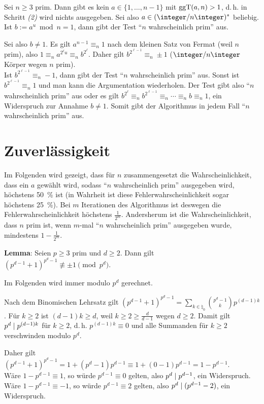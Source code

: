 \begin{Beweis}
    Sei $n \ge 3$ prim.
    Dann gibt es kein $a \in \{1, \dotsc, n - 1\}$ mit $\operatorname{ggT}(a, n) > 1$, d.\,h.
    in Schritt \emph{(2)} wird nichts ausgegeben.
    Sei also $a \in (\ZnZ)^\ast$ beliebig.
    Ist $b := a^u \bmod n = 1$, dann gibt der Test "`$n$ wahrscheinlich prim"' aus.

    Sei also $b \not= 1$.
    Es gilt $a^{n-1} \equiv_n 1$ nach dem kleinen Satz von Fermat (weil $n$ prim),
    also $1 \equiv_n a^{2^\ell u} \equiv_n b^{2^\ell}$.
    Daher gilt $b^{2^{\ell-1}} \equiv_n \pm 1$
    ($\ZnZ$ Körper wegen $n$ prim).\\
    Ist $b^{2^{\ell-1}} \equiv_n -1$, dann gibt der Test "`$n$ wahrscheinlich prim"' aus.
    Sonst ist $b^{2^{\ell-1}} \equiv_n 1$ und man kann die Argumentation wiederholen.
    Der Test gibt also "`$n$ wahrscheinlich prim"' aus oder es gilt
    $b^{2^\ell} \equiv_n b^{2^{\ell-1}} \equiv_n \dotsb \equiv_n b \equiv_n 1$,
    ein Widerspruch zur Annahme $b \not= 1$.
    Somit gibt der Algorithmus in jedem Fall "`$n$ wahrscheinlich prim"' aus.
\end{Beweis}

\section{%
    Zuverlässigkeit%
}

Im Folgenden wird gezeigt, dass für $n$ zusammengesetzt die Wahrscheinlichkeit,
dass ein $a$ gewählt wird, sodass "`$n$ wahrscheinlich prim"' ausgegeben wird,
höchstens \SI{50}{\percent} ist
(in Wahrheit ist diese Fehlerwahrscheinlichkeit sogar höchstens \SI{25}{\percent}).
Bei $m$ Iterationen des Algorithmus ist deswegen die Fehlerwahrscheinlichkeit
höchstens $\frac{1}{2^m}$.
Andersherum ist die Wahrscheinlichkeit, dass $n$ prim ist, wenn $m$-mal
"`$n$ wahrscheinlich prim"' ausgegeben wurde, mindestens $1 - \frac{1}{2^m}$.

\linie

\textbf{Lemma}:
Seien $p \ge 3$ prim und $d \ge 2$.
Dann gilt $(p^{d-1} + 1)^{p^d-1} \not\equiv \pm 1 \pmod{p^d}$.

\begin{Beweis}
    Im Folgenden wird immer modulo $p^d$ gerechnet.

    Nach dem Binomischen Lehrsatz gilt
    $(p^{d-1} + 1)^{p^d-1} = \sum_{k \in \natural_0} \binom{p^d - 1}{k} p^{(d-1)k}$.
    Für $k \ge 2$ ist $(d-1)k \ge d$, weil $k \ge 2 \ge \frac{d}{d-1}$ wegen $d \ge 2$.
    Damit gilt $p^d \mid p^{(d-1)k}$ für $k \ge 2$, d.\,h. $p^{(d-1)k} \equiv 0$ und
    alle Summanden für $k \ge 2$ verschwinden modulo $p^d$.

    Daher gilt
    $(p^{d-1} + 1)^{p^d-1} = 1 + (p^d - 1) p^{d-1} \equiv
    1 + (0 - 1)p^{d-1} = 1 - p^{d-1}$.\\
    Wäre $1 - p^{d-1} \equiv 1$, so würde $p^{d-1} \equiv 0$ gelten,
    also $p^d \mid p^{d-1}$, ein Widerspruch.\\
    Wäre $1 - p^{d-1} \equiv -1$, so würde $p^{d-1} \equiv 2$ gelten,
    also $p^d \mid (p^{d-1}-2)$,
    ein Widerspruch.
\end{Beweis}

